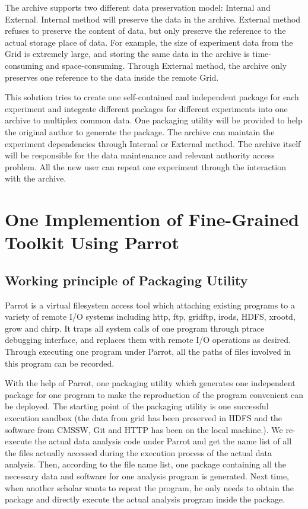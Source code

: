 \documentclass{acm_proc_article-sp}
\begin{document}
The archive supports two different data preservation model: Internal and External. Internal method will preserve the data in the archive. External method refuses to preserve the content of data, but only preserve the reference to the actual storage place of data. For example, the size of experiment data from the Grid is extremely large, and storing the same data in the archive is time-consuming and space-consuming. Through External method, the archive only preserves one reference to the data inside the remote Grid.

This solution tries to create one self-contained and independent package for each experiment and integrate different packages for different experiments into one archive to multiplex common data. One packaging utility  will be provided to help the original author to generate the package. The archive can maintain the experiment dependencies through Internal or External method. The archive itself will be responsible for the data maintenance and relevant authority access problem. All the new user can repeat one experiment through the interaction with the archive.

\section{One Implemention of Fine-Grained Toolkit Using Parrot}
\subsection{Working principle of Packaging Utility} 

Parrot is a virtual filesystem access tool which attaching existing programs to
a variety of remote I/O systems including http, ftp, gridftp, irods, HDFS,
xrootd, grow and chirp. It traps all system calls of one program through ptrace
debugging interface, and replaces them with remote I/O operations as desired.
Through executing one program under Parrot, all the paths of files involved in
this program can be recorded.  

With the help of Parrot, one packaging utility which generates one independent
package for one program to make the reproduction of the program convenient can
be deployed. The starting point of the packaging utility is one successful execution
sandbox (the data from grid has been preserved in HDFS and the software from
CMSSW, Git and HTTP has been on the local machine.). We re-execute the actual
data analysis code under Parrot and get the name list of all the files actually
accessed during the execution process of the actual data analysis. Then,
according to the file name list, one package containing all the necessary data
and software for one analysis program is generated. Next time, when another
scholar wants to repeat the program, he only needs to obtain the package and
directly execute the actual analysis program inside the package.
\end{document}
